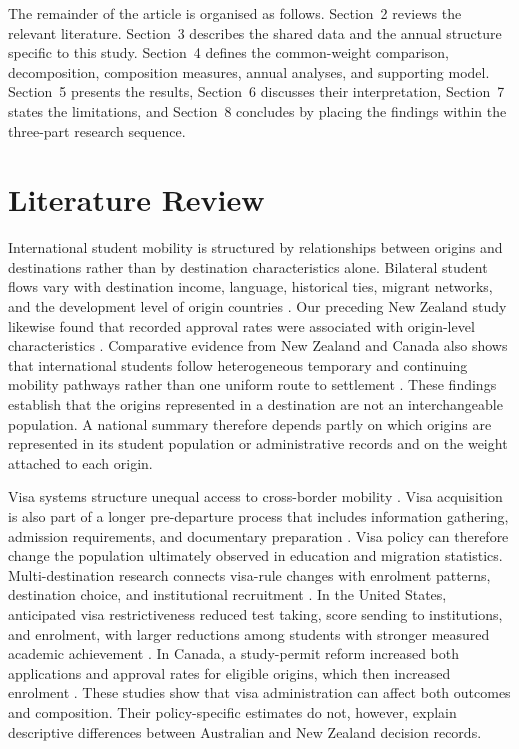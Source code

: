 \documentclass[runningheads]{llncs}
\begin{document}
The remainder of the article is organised as follows. Section~2 reviews the relevant literature. Section~3 describes the shared data and the annual structure specific to this study. Section~4 defines the common-weight comparison, decomposition, composition measures, annual analyses, and supporting model. Section~5 presents the results, Section~6 discusses their interpretation, Section~7 states the limitations, and Section~8 concludes by placing the findings within the three-part research sequence.

\section{Literature Review}

International student mobility is structured by relationships between origins and destinations rather than by destination characteristics alone. Bilateral student flows vary with destination income, language, historical ties, migrant networks, and the development level of origin countries \cite{PerkinsNeumayer2014,Weber2023}. Our preceding New Zealand study likewise found that recorded approval rates were associated with origin-level characteristics \cite{Kaplan2026NZVisaApproval}. Comparative evidence from New Zealand and Canada also shows that international students follow heterogeneous temporary and continuing mobility pathways rather than one uniform route to settlement \cite{KingEtAl2024}. These findings establish that the origins represented in a destination are not an interchangeable population. A national summary therefore depends partly on which origins are represented in its student population or administrative records and on the weight attached to each origin.

Visa systems structure unequal access to cross-border mobility \cite{Neumayer2006,Mau2015}. Visa acquisition is also part of a longer pre-departure process that includes information gathering, admission requirements, and documentary preparation \cite{KhanalGaulee2019}. Visa policy can therefore change the population ultimately observed in education and migration statistics. Multi-destination research connects visa-rule changes with enrolment patterns, destination choice, and institutional recruitment \cite{GharibEtAl2026}. In the United States, anticipated visa restrictiveness reduced test taking, score sending to institutions, and enrolment, with larger reductions among students with stronger measured academic achievement \cite{Chen2023}. In Canada, a study-permit reform increased both applications and approval rates for eligible origins, which then increased enrolment \cite{Gonnot2025}. These studies show that visa administration can affect both outcomes and composition. Their policy-specific estimates do not, however, explain descriptive differences between Australian and New Zealand decision records.
\end{document}
